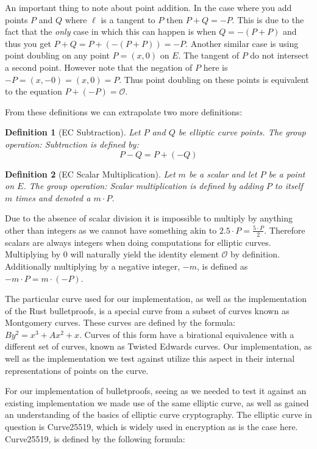 \documentclass{article}
\newtheorem{definition}{Definition}[section]
\renewcommand{\O}{\mathcal{O}}
\begin{document}
An important thing to note about point addition. In the case where
you add points $P$ and $Q$ where $\ell$ is a tangent to $P$ then $P +
Q = -P$. This is due to the fact that the \textit{only} case in which
this can happen is when $Q = -(P + P)$ and thus you get $P + Q = P +
(-(P + P)) = -P$. Another similar case is using point doubling on any
point $P = (x,0)$ on $E$. The tangent of $P$ do not intersect
a second point. However note that the negation of $P$ here is $-P =
(x,-0) = (x,0) = P$. Thus point doubling on these points is equivalent
to the equation $P + (-P) = \O$.

From these definitions we can extrapolate two more definitions:

\begin{definition}[EC Subtraction]
	Let $P$ and $Q$ be elliptic curve points. The group operation:
	Subtraction is defined by:
	$$P-Q = P + (-Q)$$
\end{definition}

\begin{definition}[EC Scalar Multiplication]
	Let $m$ be a scalar and let $P$ be a point on $E$. The group operation:
	Scalar multiplication is defined by adding $P$ to itself $m$ times and
	denoted a $m\cdot P$.
\end{definition}

Due to the absence of scalar division it is impossible to multiply by
anything other than integers as we cannot have something akin to $2.5
\cdot P = \frac{5\cdot P}{2}$. Therefore scalars are always integers
when doing computations for elliptic curves. Multiplying by $0$ will
naturally yield the identity element $\mathcal{O}$ by definition.
Additionally multiplying by a negative integer, ${-m}$, is defined as
$-m\cdot P = m\cdot ({-P})$.

The particular curve used for our implementation, as well as the
implementation of the Rust bulletproofs, is a special curve from a subset
of curves known as Montgomery curves. These curves are defined by the
formula: $By^2 = x^3 + Ax^2 + x$. Curves of this form have a birational
equivalence with a different set of curves, known as Twisted Edwards
curves. Our implementation, as well as the implementation we test against
utilize this aspect in their internal representations of points on the
curve.

For our implementation of bulletproofs, seeing as we needed to test it
against an existing implementation we made use of the same elliptic
curve, as well as gained an understanding of the basics of elliptic
curve cryptography. The elliptic curve in question is Curve25519, which
is widely used in encryption as is the case here. Curve25519, is defined by the following formula:
\end{document}
